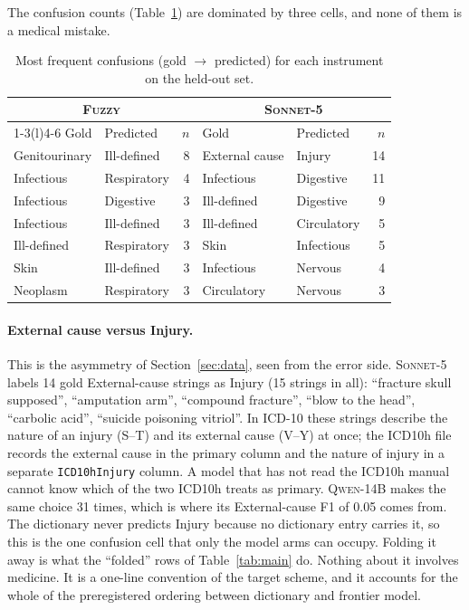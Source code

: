 \documentclass[11pt]{article}
\newcommand{\Bfuzzy}{\textsc{Fuzzy}}
\newcommand{\Mcomm}{\textsc{Sonnet-5}}
\newcommand{\Mlocal}{\textsc{Qwen-14B}}
\begin{document}
The confusion counts (Table~\ref{tab:confusions}) are dominated by three cells, and none of them is a medical mistake.

\begin{table}[t]
\centering
\caption{Most frequent confusions (gold $\to$ predicted) for each instrument on the held-out set.}
\label{tab:confusions}
\small
\begin{tabular}{llr@{\hskip 2em}llr}
\toprule
\multicolumn{3}{c}{\Bfuzzy{}} & \multicolumn{3}{c}{\Mcomm{}} \\
\cmidrule(r){1-3}\cmidrule(l){4-6}
Gold & Predicted & $n$ & Gold & Predicted & $n$ \\
\midrule
Genitourinary & Ill-defined & 8 & External cause & Injury & 14 \\
Infectious & Respiratory & 4 & Infectious & Digestive & 11 \\
Infectious & Digestive & 3 & Ill-defined & Digestive & 9 \\
Infectious & Ill-defined & 3 & Ill-defined & Circulatory & 5 \\
Ill-defined & Respiratory & 3 & Skin & Infectious & 5 \\
Skin & Ill-defined & 3 & Infectious & Nervous & 4 \\
Neoplasm & Respiratory & 3 & Circulatory & Nervous & 3 \\
\bottomrule
\end{tabular}
\end{table}

\paragraph{External cause versus Injury.} This is the asymmetry of Section~\ref{sec:data}, seen from the error side. \Mcomm{} labels 14 gold External-cause strings as Injury (15 strings in all): ``fracture skull supposed'', ``amputation arm'', ``compound fracture'', ``blow to the head'', ``carbolic acid'', ``suicide poisoning vitriol''. In ICD-10 these strings describe the nature of an injury (S--T) and its external cause (V--Y) at once; the ICD10h file records the external cause in the primary column and the nature of injury in a separate \texttt{ICD10hInjury} column. A model that has not read the ICD10h manual cannot know which of the two ICD10h treats as primary. \Mlocal{} makes the same choice 31 times, which is where its External-cause F1 of 0.05 comes from. The dictionary never predicts Injury because no dictionary entry carries it, so this is the one confusion cell that only the model arms can occupy. Folding it away is what the ``folded'' rows of Table~\ref{tab:main} do. Nothing about it involves medicine. It is a one-line convention of the target scheme, and it accounts for the whole of the preregistered ordering between dictionary and frontier model.
\end{document}
